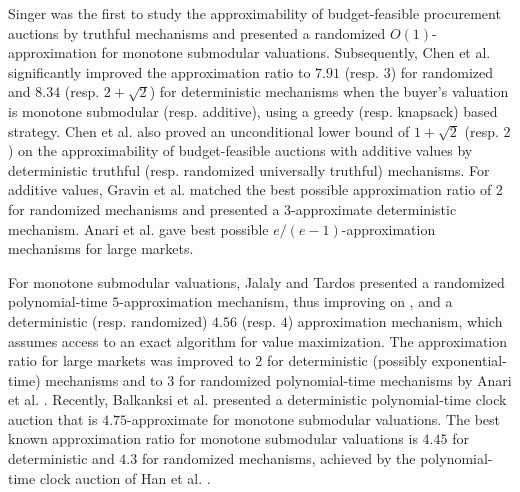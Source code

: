 Singer \cite{Singer10,Singer13} was the first to study the approximability of budget-feasible procurement auctions by truthful mechanisms and presented a randomized $O(1)$-approximation for monotone submodular valuations. Subsequently, Chen et al. \cite{ChenGL2011} significantly improved the approximation ratio to $7.91$ (resp. $3$) for randomized and $8.34$ (resp. $2+\sqrt{2}$) for deterministic mechanisms when the buyer's valuation is monotone submodular (resp. additive), using a greedy (resp. knapsack) based strategy. Chen et al. also proved an unconditional lower bound of $1+\sqrt{2}$ (resp. $2$) on the approximability of budget-feasible auctions with additive values by deterministic truthful (resp. randomized universally truthful) mechanisms. For additive values, Gravin et al. \cite{GravinJLZ2020} matched the best possible approximation ratio of $2$ for randomized mechanisms and presented a $3$-approximate deterministic mechanism. Anari et al. \cite{AnariGN2014} gave best possible $e/(e-1)$-approximation mechanisms for large markets. 

For monotone submodular valuations, Jalaly and Tardos \cite{JalalyT2021} presented a randomized polynomial-time $5$-approximation mechanism, thus improving on \cite{ChenGL2011}, 
and a deterministic (resp. randomized) $4.56$ (resp. $4$) approximation mechanism, which assumes access to an exact algorithm for value maximization.
The approximation ratio for large markets was improved to $2$ for deterministic (possibly exponential-time) mechanisms and to $3$ for randomized polynomial-time mechanisms by Anari et al. \cite{AnariGN2014}. Recently, Balkanksi et al. \cite{BalkanskiGGST2022} presented a deterministic polynomial-time clock auction that is $4.75$-approximate for monotone submodular valuations. The best known approximation ratio for monotone submodular valuations is $4.45$ for deterministic and $4.3$ for randomized mechanisms, achieved by the polynomial-time clock auction of Han et al. \cite{HanWHC23}. %

